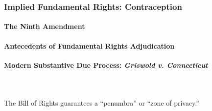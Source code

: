 \subsubsection{Implied Fundamental Rights: Contraception}
 
\paragraph{The Ninth Amendment}
 
 
\paragraph{Antecedents of Fundamental Rights Adjudication}
 
 
\paragraph{Modern Substantive Due Process: \emph{Griswold v. Connecticut}}
~\\\\
The Bill of Rights guarantees a ``penumbra'' or ``zone of privacy.''

